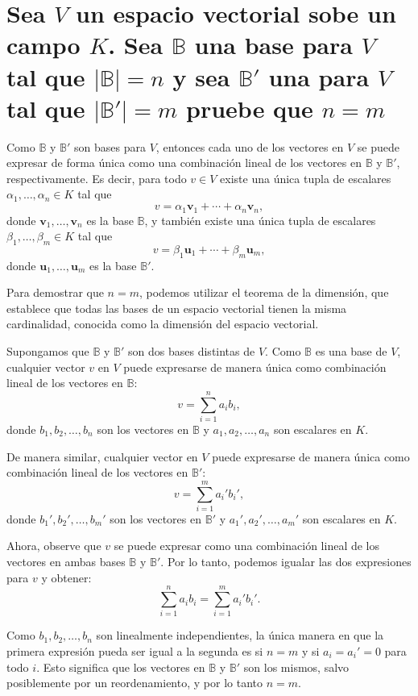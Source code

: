 \section{Sea $V$ un espacio vectorial sobe un campo $K$. Sea $\mathbb{B}$ una base para $V$ tal que $|\mathbb{B}| = n$ y sea $\mathbb{B} '$ una para $V$ tal que $|\mathbb{B}'|=m$ pruebe que $n=m$} Como $\mathbb{B}$ y $\mathbb{B}'$ son bases para $V$, entonces cada uno de los vectores en $V$ se puede expresar de forma única como una combinación lineal de los vectores en $\mathbb{B}$ y $\mathbb{B}'$, respectivamente. Es decir, para todo $v \in V$ existe una única tupla de escalares $\alpha_1,\ldots,\alpha_n \in K$ tal que $$v = \alpha_1 \mathbf{v}_1 + \cdots + \alpha_n \mathbf{v}_n,$$ donde ${\mathbf{v}_1,\ldots,\mathbf{v}_n}$ es la base $\mathbb{B}$, y también existe una única tupla de escalares $\beta_1,\ldots,\beta_m \in K$ tal que $$v = \beta_1 \mathbf{u}_1 + \cdots + \beta_m \mathbf{u}_m,$$ donde ${\mathbf{u}_1,\ldots,\mathbf{u}_m}$ es la base $\mathbb{B}'$.

Para demostrar que $n=m$, podemos utilizar el teorema de la dimensión, que establece que todas las bases de un espacio vectorial tienen la misma cardinalidad, conocida como la dimensión del espacio vectorial.

Supongamos que $\mathbb{B}$ y $\mathbb{B}'$ son dos bases distintas de $V$. Como $\mathbb{B}$ es una base de $V$, cualquier vector $v$ en $V$ puede expresarse de manera única como combinación lineal de los vectores en $\mathbb{B}$:
$$v = \sum_{i=1}^n a_i b_i,$$
donde $b_1, b_2, \dots, b_n$ son los vectores en $\mathbb{B}$ y $a_1, a_2, \dots, a_n$ son escalares en $K$.

De manera similar, cualquier vector en $V$ puede expresarse de manera única como combinación lineal de los vectores en $\mathbb{B}'$:
$$v = \sum_{i=1}^m a_i' b_i',$$
donde $b_1', b_2', \dots, b_m'$ son los vectores en $\mathbb{B}'$ y $a_1', a_2', \dots, a_m'$ son escalares en $K$.

Ahora, observe que $v$ se puede expresar como una combinación lineal de los vectores en ambas bases $\mathbb{B}$ y $\mathbb{B}'$. Por lo tanto, podemos igualar las dos expresiones para $v$ y obtener:
$$\sum_{i=1}^n a_i b_i = \sum_{i=1}^m a_i' b_i'.$$

Como $b_1, b_2, \dots, b_n$ son linealmente independientes, la única manera en que la primera expresión pueda ser igual a la segunda es si $n=m$ y si $a_i=a_i'=0$ para todo $i$. Esto significa que los vectores en $\mathbb{B}$ y $\mathbb{B}'$ son los mismos, salvo posiblemente por un reordenamiento, y por lo tanto $n=m$.
